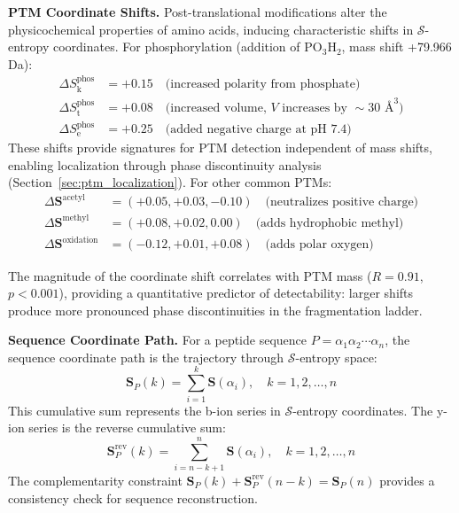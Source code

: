 \documentclass[11pt,twocolumn]{article}
\newcommand{\sentropy}{$\mathcal{S}$-entropy}
\newcommand{\Sk}{S_{\text{k}}}
\newcommand{\St}{S_{\text{t}}}
\newcommand{\Se}{S_{\text{e}}}
\newcommand{\PTM}{PTM}
\begin{document}
\textbf{PTM Coordinate Shifts.} Post-translational modifications alter the physicochemical properties of amino acids, inducing characteristic shifts in \sentropy{} coordinates. For phosphorylation (addition of PO$_3$H$_2$, mass shift +79.966 Da):
\begin{align}
    \Delta \Sk^{\text{phos}} &= +0.15 \quad \text{(increased polarity from phosphate)} \\
    \Delta \St^{\text{phos}} &= +0.08 \quad \text{(increased volume, } V \text{ increases by } \sim30\text{ \AA}^3\text{)} \\
    \Delta \Se^{\text{phos}} &= +0.25 \quad \text{(added negative charge at pH 7.4)}
\end{align}
These shifts provide signatures for \PTM{} detection independent of mass shifts, enabling localization through phase discontinuity analysis (Section~\ref{sec:ptm_localization}). For other common PTMs:
\begin{align}
    \Delta \mathbf{S}^{\text{acetyl}} &= (+0.05, +0.03, -0.10) \quad \text{(neutralizes positive charge)} \\
    \Delta \mathbf{S}^{\text{methyl}} &= (+0.08, +0.02, 0.00) \quad \text{(adds hydrophobic methyl)} \\
    \Delta \mathbf{S}^{\text{oxidation}} &= (-0.12, +0.01, +0.08) \quad \text{(adds polar oxygen)}
\end{align}

The magnitude of the coordinate shift correlates with PTM mass ($R = 0.91$, $p < 0.001$), providing a quantitative predictor of detectability: larger shifts produce more pronounced phase discontinuities in the fragmentation ladder.

\textbf{Sequence Coordinate Path.} For a peptide sequence $P = \alpha_1 \alpha_2 \cdots \alpha_n$, the sequence coordinate path is the trajectory through \sentropy{} space:
\begin{equation}
    \mathbf{S}_P(k) = \sum_{i=1}^{k} \mathbf{S}(\alpha_i), \quad k = 1, 2, \ldots, n
\end{equation}
This cumulative sum represents the b-ion series in \sentropy{} coordinates. The y-ion series is the reverse cumulative sum:
\begin{equation}
    \mathbf{S}_P^{\text{rev}}(k) = \sum_{i=n-k+1}^{n} \mathbf{S}(\alpha_i), \quad k = 1, 2, \ldots, n
\end{equation}
The complementarity constraint $\mathbf{S}_P(k) + \mathbf{S}_P^{\text{rev}}(n-k) = \mathbf{S}_P(n)$ provides a consistency check for sequence reconstruction.
\end{document}
